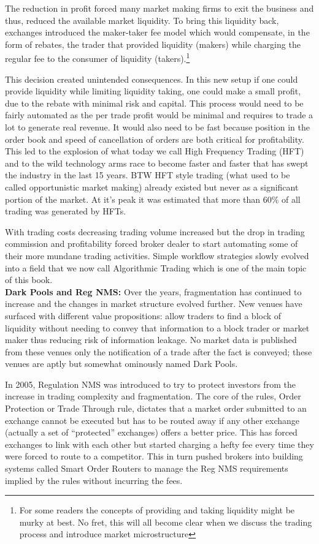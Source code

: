  
The reduction in profit forced many market making firms to exit the business and thus, reduced the  available market liquidity. To bring this liquidity back, exchanges introduced the maker-taker fee model which would compensate, in the form of rebates, the trader that provided liquidity (makers) while charging the regular fee to the consumer of liquidity (takers).\footnote{For some readers the concepts of providing and taking liquidity might be murky at best. No fret, this will all become clear when we discuss the trading process and introduce market microstructure}


This decision created unintended consequences. In this new setup if one could provide liquidity while limiting liquidity taking, one could make a small profit, due to the rebate with minimal risk and capital. This process would need to be fairly automated as the per trade profit would be minimal and requires to trade a lot to generate real revenue. It would also need to be fast because position in the order book and speed of cancellation of orders are both critical for profitability. This led to the explosion of what today we call High Frequency Trading (HFT) and to the wild technology arms race to become faster and faster that has swept the industry in the last 15 years. BTW HFT style trading (what used to be called opportunistic market making) already existed but never as a significant portion of the market. At it's peak it was estimated that more than 60\% of all trading was generated by HFTs.


With trading costs decreasing trading volume increased but the drop in trading commission and profitability forced broker dealer to start automating some of their more mundane trading activities. Simple workflow strategies slowly evolved into a field that we now call Algorithmic Trading which is one of the main topic of this book. \\


\noindent\textbf{Dark Pools and Reg NMS:} Over the years, fragmentation has continued to increase and the changes in market structure evolved further. New venues have surfaced with different value propositions: allow traders to find a block of liquidity without needing to convey that information to a block trader or market maker thus reducing risk of information leakage. No market data is published from these venues only the notification of a trade after the fact is conveyed; these venues are aptly but somewhat ominously named Dark Pools.


In 2005, Regulation NMS was introduced to try to protect investors from the increase in trading complexity and fragmentation. The core of the rules, Order Protection or Trade Through rule, dictates that a market order submitted to an exchange cannot be executed but has to be routed away if any other exchange (actually a set of ``protected'' exchanges) offers a better price. This has forced exchanges to link with each other but started charging a hefty fee every time they were forced to route to a competitor. This in turn pushed brokers into building systems called Smart Order Routers to manage the Reg NMS requirements implied by the rules without incurring the fees. \\



